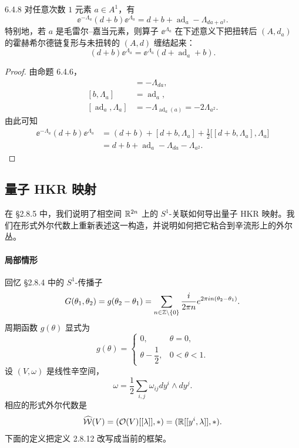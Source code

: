 \begin{proposition}{6.4.8}
  对任意次数 $1$ 元素 $a\in A^1$，有
  \[
  \ee^{-\Lambda_a}(d+b)\ee^{\Lambda_a}
  =d+b+\operatorname{ad}_a-\Lambda_{da+a^2}.
  \]
  特别地，若 $a$ 是毛雷尔–嘉当元素，则算子 $\ee^{\Lambda_a}$ 在下述意义下把扭转后 $(A,d_a)$ 的霍赫希尔德链复形与未扭转的 $(A,d)$ 缠结起来：
  \[
  (d+b)\ee^{\Lambda_a}=\ee^{\Lambda_a}(d+\operatorname{ad}_a+b).
  \]
\end{proposition}

\begin{proof}
由命题 6.4.6，
\begin{align*}
[d,\Lambda_a]&=-\Lambda_{da},\\
[b,\Lambda_a]&=\operatorname{ad}_a,\\
[\operatorname{ad}_a,\Lambda_a]
&=-\Lambda_{\operatorname{ad}_a(a)}=-2\Lambda_{a^2}.
\end{align*}
由此可知
\begin{align*}
\ee^{-\Lambda_a}(d+b)\ee^{\Lambda_a}
&=(d+b)+[d+b,\Lambda_a]+\frac12\bigl[[d+b,\Lambda_a],\Lambda_a\bigr]\\
&=d+b+\operatorname{ad}_a-\Lambda_{da}-\Lambda_{a^2}.
\end{align*}
\end{proof}

\subsection{量子 HKR 映射}

在 §2.8.5 中，我们说明了相空间 $\mathbb{R}^{2n}$ 上的 $S^1$-关联如何导出量子 HKR 映射。我们在形式外尔代数上重新表述这一构造，并说明如何把它粘合到辛流形上的外尔丛。

\paragraph{局部情形}\par

回忆 §2.8.4 中的 $S^1$-传播子
\[
G(\theta_1,\theta_2)=g(\theta_2-\theta_1)
=\sum_{n\in\mathbb{Z}\setminus\{0\}}\frac{i}{2\pi n}
e^{2\pi in(\theta_2-\theta_1)}.
\]
周期函数 $g(\theta)$ 显式为
\[
g(\theta)=
\begin{cases}
0, & \theta=0,\\[2pt]
\theta-\dfrac12, & 0<\theta<1.
\end{cases}
\]
设 $(V,\omega)$ 是线性辛空间，
\[
\omega=\frac12\sum_{i,j}\omega_{ij}dy^i\wedge dy^j.
\]
相应的形式外尔代数是
\[
\widehat{\mathcal W}(V)
=(\mathcal O(V)[[\lambda]],\ast)
=(\mathbb{R}[[y^i,\lambda]],\ast).
\]
下面的定义把定义 2.8.12 改写成当前的框架。

